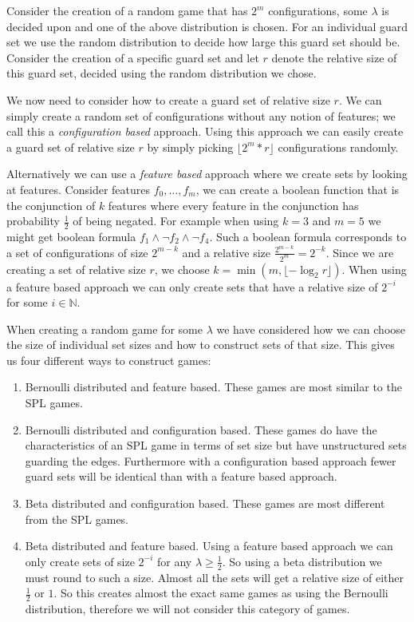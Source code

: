 Consider the creation of a random game that has $2^m$ configurations, some $\lambda$ is decided upon and one of the above distribution is chosen. For an individual guard set we use the random distribution to decide how large this guard set should be. Consider the creation of a specific guard set and let $r$ denote the relative size of this guard set, decided using the random distribution we chose.

We now need to consider how to create a guard set of relative size $r$. We can simply create a random set of configurations without any notion of features; we call this a \textit{configuration based} approach. Using this approach we can easily create a guard set of relative size $r$ by simply picking $\lfloor 2^m*r\rfloor$ configurations randomly.

Alternatively we can use a \textit{feature based} approach where we create sets by looking at features. Consider features $f_0, \dots, f_m$, we can create a boolean function that is the conjunction of $k$ features where every feature in the conjunction has probability $\frac{1}{2}$ of being negated.  For example when using $k=3$ and $m=5$ we might get boolean formula $f_1 \wedge \neg f_2 \wedge \neg f_4$. Such a boolean formula corresponds to a set of configurations of size $2^{m-k}$ and a relative size $\frac{2^{m-k}}{2^m} = 2^{-k}$. Since we are creating a set of relative size $r$, we choose $k = \min(m, \lfloor -\log_2{r} \rfloor)$. When using a feature based approach we can only create sets that have a relative size of $2^{-i}$ for some $i \in \mathbb{N}$.

When creating a random game for some $\lambda$ we have considered how we can choose the size of individual set sizes and how to construct sets of that size. This gives us four different ways to construct games:
\begin{enumerate}
	\item Bernoulli distributed and feature based. These games are most similar to the SPL games.
	\item Bernoulli distributed and configuration based. These games do have the characteristics of an SPL game in terms of set size but have unstructured sets guarding the edges. Furthermore with a configuration based approach fewer guard sets will be identical than with a feature based approach.
	\item Beta distributed and configuration based. These games are most different from the SPL games.
	\item Beta distributed and feature based. Using a feature based approach we can only create sets of size $2^{-i}$ for any $\lambda \geq \frac{1}{2}$. So using a beta distribution we must round to such a size. Almost all the sets will get a relative size of either $\frac{1}{2}$ or $1$. So this creates almost the exact same games as using the Bernoulli distribution, therefore we will not consider this category of games.
\end{enumerate}

